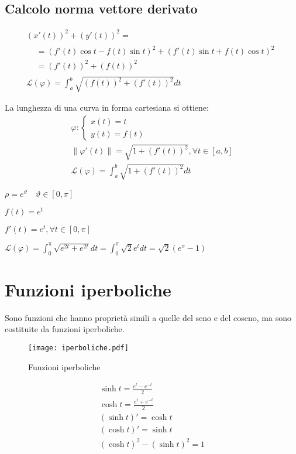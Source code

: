 \subsection{Calcolo norma vettore derivato}
\begin{gather}
	(x'(t))^2+(y'(t))^2 = \\
	\begin{align}
	&=(f'(t)\cos t-f(t)\sin t)^2 + (f'(t)\sin t + f(t) \cos t)^2 \\ 
	&= (f'(t))^2+(f(t))^2 
	\end{align} \\
	\mathcal{L}(\varphi)=\int_a^b \sqrt{(f(t))^2+(f'(t))^2} dt
\end{gather}

La lunghezza di una curva in forma cartesiana si ottiene:
\begin{gather}
	\varphi: \begin{cases}
		x(t)=t \\
		y(t)=f(t)
	\end{cases} \\
	\left\|\varphi'(t)\right\|=\sqrt{1+(f'(t))^2}, \forall t\in [a, b] \\
	\mathcal{L}(\varphi)=\int_a^b \sqrt{1+(f'(t))^2} dt
\end{gather}	


\begin{example}
	$\rho=e^\vartheta\quad \vartheta\in [0, \pi]$
	
	$f(t)=e^t$
	
	$f'(t)=e^t, \forall t\in [0, \pi]$	
	
	$\mathcal{L}(\varphi)=\int_0^\pi \sqrt{e^{2t}+e^{2t}}dt=\int_0^\pi \sqrt{2} e^t dt=\sqrt{2}(e^\pi -1)$
	
\end{example}

\section{Funzioni iperboliche}
Sono funzioni che hanno proprietà simili a quelle del seno e del coseno, ma sono costituite da funzioni iperboliche.

\begin{figure}
	\texttt{[image: iperboliche.pdf]}
	\centering
	\caption{Funzioni iperboliche}
\end{figure}


\begin{gather}
	\sinh t=\frac{e^t-e^{-t}}{2} \\
	\cosh t=\frac{e^t+e^{-t}}{2} \\
	(\sinh t)'=\cosh t \\
	(\cosh t)'=\sinh t \\
	(\cosh t)^2-(\sinh t)^2 = 1
\end{gather}

